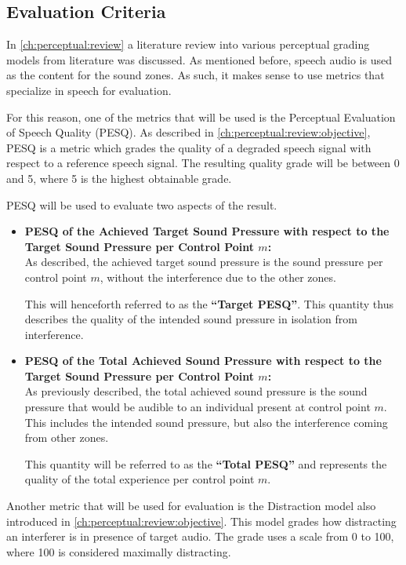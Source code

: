 \subsection{Evaluation Criteria}
In \autoref{ch:perceptual:review} a literature review into various perceptual grading models from literature was discussed.
As mentioned before, speech audio is used as the content for the sound zones.
As such, it makes sense to use metrics that specialize in speech for evaluation.

For this reason, one of the metrics that will be used is the Perceptual Evaluation of Speech Quality (PESQ).
As described in \autoref{ch:perceptual:review:objective}, PESQ is a metric which grades the quality of a degraded speech signal with respect to a reference speech signal.
The resulting quality grade will be between 0 and 5, where 5 is the highest obtainable grade.

PESQ will be used to evaluate two aspects of the result.
\begin{itemize}
    \item \textbf{PESQ of the Achieved Target Sound Pressure with respect to the Target Sound Pressure per Control Point $m$:}\\
        As described, the achieved target sound pressure is the sound pressure per control point $m$, without the interference due to the other zones. 

        This will henceforth referred to as the \textbf{``Target PESQ''}.
        This quantity thus describes the quality of the intended sound pressure in isolation from interference.
    \item \textbf{PESQ of the Total Achieved Sound Pressure with respect to the Target Sound Pressure per Control Point $m$:}\\
        As previously described, the total achieved sound pressure is the sound pressure that would be audible to an individual present at control point $m$.  
        This includes the intended sound pressure, but also the interference coming from other zones.

        This quantity will be referred to as the \textbf{``Total PESQ''} and represents the quality of the total experience per control point $m$. 
\end{itemize}

Another metric that will be used for evaluation is the Distraction model also introduced in \autoref{ch:perceptual:review:objective}.
This model grades how distracting an interferer is in presence of target audio.
The grade uses a scale from 0 to 100, where 100 is considered maximally distracting.

